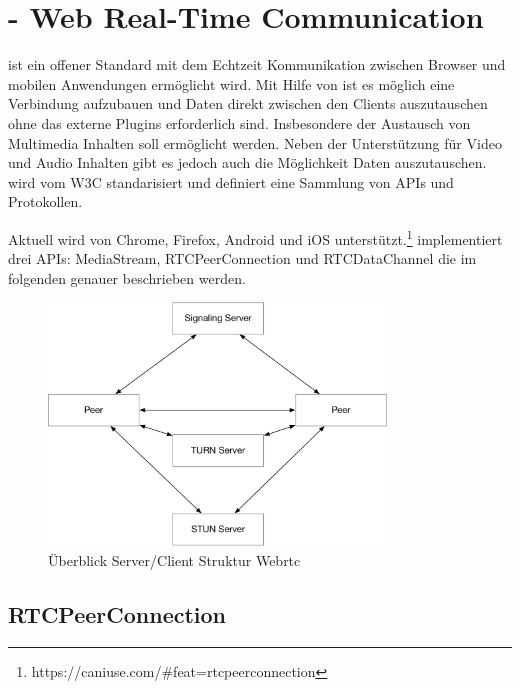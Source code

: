 \section{\webrtc - Web Real-Time Communication}

\webrtc ist ein offener Standard mit dem Echtzeit Kommunikation zwischen Browser und mobilen Anwendungen ermöglicht wird. Mit Hilfe von \webrtc ist es möglich eine \pTp Verbindung aufzubauen und Daten direkt zwischen den Clients auszutauschen ohne das externe Plugins erforderlich sind. Insbesondere der Austausch von Multimedia Inhalten soll ermöglicht werden. Neben der Unterstützung für Video und Audio Inhalten gibt es jedoch auch die Möglichkeit Daten auszutauschen. \webrtc wird vom W3C\cite{w3Webrtc} standarisiert und definiert eine Sammlung von APIs und Protokollen. 


Aktuell wird \webrtc von Chrome, Firefox, Android und iOS unterstützt.\footnote{https://caniuse.com/\#feat=rtcpeerconnection} \webrtc implementiert drei APIs: MediaStream, RTCPeerConnection und RTCDataChannel die im folgenden genauer beschrieben werden.

\begin{figure}[!h]
	\centering
	\includegraphics[width=0.8\textwidth]{figures/Webrtc_overview}
	\caption[A Figure Short-Title]{Überblick Server/Client Struktur Webrtc}
	\label{fig:swLifecycle}
\end{figure}





\subsection{RTCPeerConnection}

